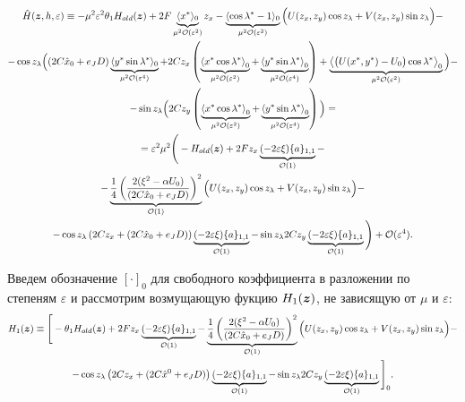 \begin{multline*}
\hat H(\boldsymbol{z}, h, \varepsilon) \equiv -\mu^2 \varepsilon^2 \theta_1 H_{old}(\boldsymbol{z}) + 
    2F \underbrace{\langle x^* \rangle_0}_{\mu^2 \mathcal{O}(\varepsilon^2)} z_x - 
    \underbrace{\langle \cos \lambda^* -1 \rangle_0}_{\mu^2 \mathcal{O}(\varepsilon^2)} \Big( 
        U(z_x,z_y) \cos z_\lambda + 
        V(z_x,z_y) \sin z_\lambda \Big) - \\
    - \cos z_\lambda \Big( 
        (2C \hat x_0 + e_J D) \underbrace{\langle y^* \sin \lambda^* \rangle_0}_{\mu^2 \mathcal{O}(\varepsilon^4)} + 
        2C z_x \left( 
            \underbrace{\left\langle x^* \cos \lambda^* \right\rangle_0}_{\mu^2 \mathcal{O}(\varepsilon^2)} + 
            \underbrace{\left\langle y^* \sin \lambda^* \right\rangle_0}_{\mu^2 \mathcal{O}(\varepsilon^4)} \right) + 
            \underbrace{\left\langle \big( U(x^*,y^*) - U_0 \big) \cos \lambda^* \right\rangle_0}_{\mu^2 \mathcal{O}(\varepsilon^2)}
        \Big) - \\
    - \sin z_\lambda \Big( 
        2C z_y \left( 
            \underbrace{\left\langle x^* \cos \lambda^* \right\rangle_0}_{\mu^2 \mathcal{O}(\varepsilon^2)} + 
            \underbrace{\left\langle y^* \sin \lambda^* \right\rangle_0}_{\mu^2 \mathcal{O}(\varepsilon^4)} 
        \right) \Big) = \\
= \varepsilon^2 \mu^2 \Bigg( - H_{old}(\boldsymbol{z}) +
    2F z_x \underbrace{(-2 \varepsilon \xi ) \{a\}_{1,1}}_{\mathcal{O}(1)} - \\ - \underbrace{\frac{1}{4}\left( \frac{2(\xi^2-\alpha U_0)}{(2C \hat x_0 + e_J D)} \right)^2}_{\mathcal{O}(1)}\Big( 
        U(z_x,z_y) \cos z_\lambda + 
        V(z_x,z_y) \sin z_\lambda \Big) - \\
    - \cos z_\lambda
        \left(2C z_x +(2C \hat x_0 + e_J D) \right) \underbrace{(-2 \varepsilon \xi ) \{a\}_{1,1}}_{\mathcal{O}(1)}
    - \sin z_\lambda
        2C z_y \underbrace{(-2 \varepsilon \xi ) \{a\}_{1,1}}_{\mathcal{O}(1)}
    \Bigg) + \mathcal{O}(\varepsilon^4).
\end{multline*}

Введем обозначение $[ \cdot ]_0$ для свободного коэффициента в разложении по степеням $\varepsilon$ и рассмотрим возмущающую фукцию $H_1(\boldsymbol{z})$, не зависящую от $\mu$ и $\varepsilon$:  
\begin{multline*}
H_1(\boldsymbol{z}) \equiv \Bigg[ -\theta_1 H_{old}(\boldsymbol{z}) + 2F z_x \underbrace{(-2 \varepsilon \xi ) \{a\}_{1,1}}_{\mathcal{O}(1)} - \underbrace{\frac{1}{4}\left( \frac{2(\xi^2-\alpha U_0)}{(2C \hat x_0 + e_J D)} \right)^2}_{\mathcal{O}(1)}\Big( 
        U(z_x,z_y) \cos z_\lambda + 
        V(z_x,z_y) \sin z_\lambda \Big) - \\
    - \cos z_\lambda
        \left(2C z_x +(2C \hat x^0 + e_J D) \right) \underbrace{(-2 \varepsilon \xi ) \{a\}_{1,1}}_{\mathcal{O}(1)}
    - \sin z_\lambda
        2C z_y \underbrace{(-2 \varepsilon \xi ) \{a\}_{1,1}}_{\mathcal{O}(1)} \Bigg]_0.
\end{multline*}

